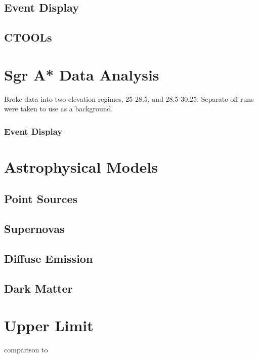 \subsection{Event Display}
\subsection{CTOOLs}

\section{Sgr A* Data Analysis}
Broke data into two elevation regimes, 25-28.5\degree, and 28.5-30.25\degree.
Separate off runs were taken to use as a background.

  \subsubsection{Event Display}

\section{Astrophysical Models}

\subsection{Point Sources}

\subsection{Supernovas}

\subsection{Diffuse Emission}

\subsection{Dark Matter}

\section{Upper Limit}

comparison to 

